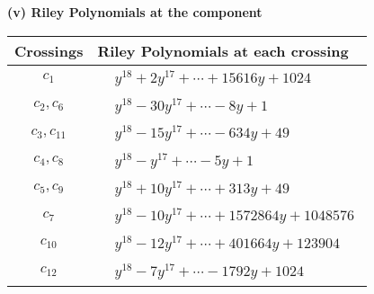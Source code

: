 \documentclass[1p]{elsarticle_modified}
\theoremstyle{definition}
\begin{document}
\newpage\renewcommand{\arraystretch}{1}
\flushleft \textbf{(v) Riley Polynomials at the component}\newline \\
\begin{tabular}{m{50pt}|m{274pt}}
Crossings & \hspace{64pt}Riley Polynomials at each crossing \\
\hline $$\begin{aligned}c_{1}\end{aligned}$$&$\begin{aligned}
&y^{18}+2 y^{17}+\cdots+15616 y+1024
\end{aligned}$\\
\hline $$\begin{aligned}c_{2},c_{6}\end{aligned}$$&$\begin{aligned}
&y^{18}-30 y^{17}+\cdots-8 y+1
\end{aligned}$\\
\hline $$\begin{aligned}c_{3},c_{11}\end{aligned}$$&$\begin{aligned}
&y^{18}-15 y^{17}+\cdots-634 y+49
\end{aligned}$\\
\hline $$\begin{aligned}c_{4},c_{8}\end{aligned}$$&$\begin{aligned}
&y^{18}- y^{17}+\cdots-5 y+1
\end{aligned}$\\
\hline $$\begin{aligned}c_{5},c_{9}\end{aligned}$$&$\begin{aligned}
&y^{18}+10 y^{17}+\cdots+313 y+49
\end{aligned}$\\
\hline $$\begin{aligned}c_{7}\end{aligned}$$&$\begin{aligned}
&y^{18}-10 y^{17}+\cdots+1572864 y+1048576
\end{aligned}$\\
\hline $$\begin{aligned}c_{10}\end{aligned}$$&$\begin{aligned}
&y^{18}-12 y^{17}+\cdots+401664 y+123904
\end{aligned}$\\
\hline $$\begin{aligned}c_{12}\end{aligned}$$&$\begin{aligned}
&y^{18}-7 y^{17}+\cdots-1792 y+1024
\end{aligned}$\\
\hline
\end{tabular}\\~\\
\end{document}
